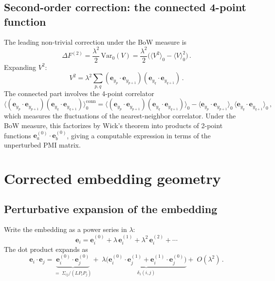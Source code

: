 \documentclass[11pt]{article}
\newcommand{\ee}{\bm{e}}
\begin{document}
\subsection{Second-order correction: the connected 4-point function}

The leading non-trivial correction under the BoW measure is
\begin{equation}\label{eq:second-order}
    \Delta F^{(2)} = \frac{\lambda^2}{2}\,\mathrm{Var}_0(V) = \frac{\lambda^2}{2}\Big(\langle V^2 \rangle_0 - \langle V \rangle_0^2\Big)\,.
\end{equation}
Expanding $V^2$:
\begin{equation}
    V^2 = \lambda^2 \sum_{p, q} (\ee_{y_p} \cdot \ee_{y_{p+1}})(\ee_{y_q} \cdot \ee_{y_{q+1}})\,.
\end{equation}
The connected part involves the 4-point correlator
\begin{equation}\label{eq:4point}
    \langle (\ee_{y_p} \cdot \ee_{y_{p+1}})(\ee_{y_q} \cdot \ee_{y_{q+1}}) \rangle_0^{\text{conn}} = \langle (\ee_{y_p} \cdot \ee_{y_{p+1}})(\ee_{y_q} \cdot \ee_{y_{q+1}}) \rangle_0 - \langle \ee_{y_p} \cdot \ee_{y_{p+1}} \rangle_0\, \langle \ee_{y_q} \cdot \ee_{y_{q+1}} \rangle_0\,,
\end{equation}
which measures the fluctuations of the nearest-neighbor correlator. Under the BoW measure, this factorizes by Wick's theorem into products of 2-point functions $\ee_a^{(0)} \cdot \ee_b^{(0)}$, giving a computable expression in terms of the unperturbed PMI matrix.

\section{Corrected embedding geometry}\label{sec:corrected}

\subsection{Perturbative expansion of the embedding}

Write the embedding as a power series in $\lambda$:
\begin{equation}\label{eq:embedding-expansion}
    \ee_i = \ee_i^{(0)} + \lambda\, \ee_i^{(1)} + \lambda^2\, \ee_i^{(2)} + \cdots
\end{equation}
The dot product expands as
\begin{equation}\label{eq:dot-expansion}
    \ee_i \cdot \ee_j = \underbrace{\ee_i^{(0)} \cdot \ee_j^{(0)}}_{=\;\Sigma_{ij}/(L P_i P_j)} + \;\lambda\underbrace{\big(\ee_i^{(0)} \cdot \ee_j^{(1)} + \ee_i^{(1)} \cdot \ee_j^{(0)}\big)}_{\delta_1(i,j)} + \;O(\lambda^2)\,.
\end{equation}
\end{document}
